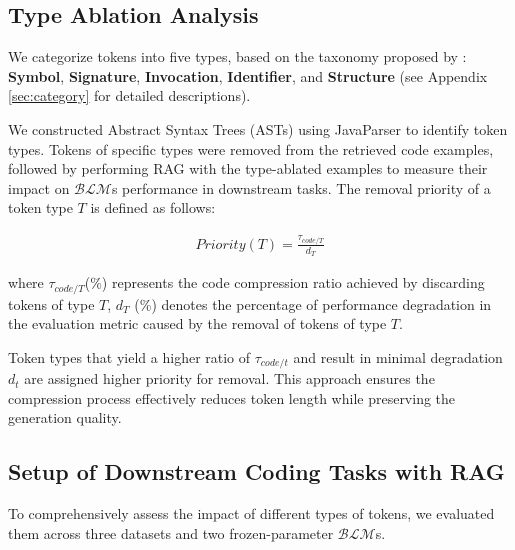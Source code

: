 \subsection{Type Ablation Analysis}
We categorize tokens into five types, based on the taxonomy proposed by \citealp{natural}: \textbf{Symbol}, \textbf{Signature}, \textbf{Invocation}, \textbf{Identifier}, and \textbf{Structure} (see Appendix \ref{sec:category} for detailed descriptions). 

We constructed Abstract Syntax Trees (ASTs) using JavaParser \citep{javaparser} to identify token types. %
Tokens of specific types were removed from the retrieved code examples, followed by performing RAG with the type-ablated examples to measure their impact on $\mathcal{BLM}$s performance in downstream tasks. The removal priority of a token type $T$ is defined as follows:

\begin{align}
Priority(T) = \frac{\tau_{code/T}}{d_{T}}
\end{align}

\noindent where $\tau_{code/T}$(\%) represents the code compression ratio achieved by discarding tokens of type $T$, 
 $d_{T}$ (\%) denotes the percentage of performance degradation in the evaluation metric caused by the removal of tokens of type $T$.

Token types that yield a higher ratio of $\tau_{code/t}$ and result in minimal degradation $d_{t}$ are assigned higher priority for removal. This approach ensures the compression process effectively reduces token length while preserving the generation quality.

\subsection{Setup of Downstream Coding Tasks with RAG}\label{sec:setup}
To comprehensively assess the impact of different types of tokens, we evaluated them across three datasets and two frozen-parameter $\mathcal{BLM}$s.

